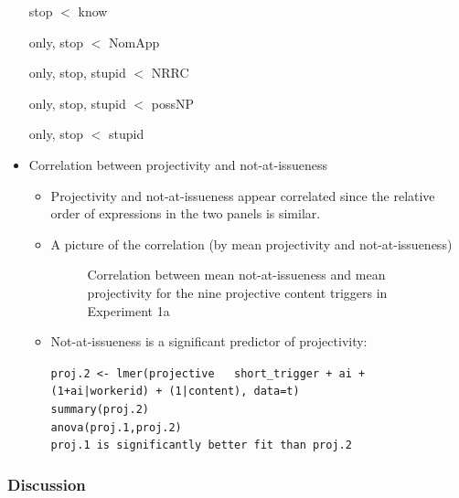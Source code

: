 \documentclass[11pt,fleqn]{article}
\newcommand{\6}{\mbox{$[\hspace*{-.6mm}[$}}
\newcommand{\9}{\mbox{$]\hspace*{-.6mm}]$}}
\begin{document}
\begin{itemize}
stop $<$ know

only, stop $<$ NomApp

only, stop, stupid $<$ NRRC

only, stop, stupid $<$ possNP

only, stop $<$ stupid

\item Correlation between projectivity and not-at-issueness


\begin{itemize}

\item Projectivity and not-at-issueness appear correlated since the relative order of expressions in the two panels is similar. 

\item A picture of the correlation (by mean projectivity and not-at-issueness)

\begin{figure}[!h]

\begin{center}

\end{center}

\caption{Correlation between mean not-at-issueness and mean projectivity for the nine projective content triggers in Experiment 1a}\label{f-corr1a}
\end{figure}

\item Not-at-issueness is a significant predictor of projectivity:

{\tt proj.2 <- lmer(projective ~ short\_trigger + ai + (1+ai|workerid) + (1|content), data=t)
\\ summary(proj.2)
\\ anova(proj.1,proj.2)
\\ proj.1 is significantly better fit than proj.2}


\end{itemize}

\end{itemize}


\subsubsection{Discussion}
\end{document}
